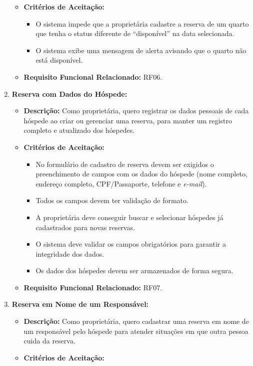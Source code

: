 \documentclass[
	12pt,				%
	openany,			%
	twoside,			%
	a4paper,			%
	english,			%
	french,				%
	spanish,			%
	brazil				%
	]{abntex2}
\begin{document}
\begin{enumerate}[label=\textbf{\arabic*.}]
\begin{itemize}
	 	\item \textbf{Critérios de Aceitação:}
	 	\begin{itemize}
	 		\item O sistema impede que a proprietária cadastre a reserva de um quarto que tenha o status diferente de “disponível” na data selecionada.
	 		\item O sistema exibe uma mensagem de alerta avisando que o quarto não está disponível.
	 	\end{itemize}
	 	\item \textbf{Requisito Funcional Relacionado:} RF06.
	 \end{itemize} 
	   \vspace{2cm}
	  \item \textbf{Reserva com Dados do Hóspede:}
	 \begin{itemize}
	 	\item \textbf{Descrição:} Como proprietária, quero registrar os dados pessoais de cada hóspede ao criar ou gerenciar uma reserva, para manter um registro completo e atualizado dos hóspedes.
	 	\item \textbf{Critérios de Aceitação:}
	 	\begin{itemize}
	 		\item No formulário de cadastro de reserva devem ser exigidos o preenchimento de campos com os dados do hóspede (nome completo, endereço completo, CPF/Passaporte, telefone e \textit{e-mail}).
	 		\item Todos os campos devem ter validação de formato.
	 		\item A proprietária deve conseguir buscar e selecionar hóspedes já cadastrados para novas reservas.
	 		\item O sistema deve validar os campos obrigatórios para garantir a integridade dos dados.
	 		\item Os dados dos hóspedes devem ser armazenados de forma segura.
	 	\end{itemize}
	 	\item \textbf{Requisito Funcional Relacionado:} RF07.
	 \end{itemize} 
	  \item \textbf{Reserva em Nome de um Responsável:}
	 \begin{itemize}
	 	\item \textbf{Descrição:} Como proprietária, quero cadastrar uma reserva em nome de um responsável pelo hóspede para atender situações em que outra pessoa cuida da reserva.
	 	\item \textbf{Critérios de Aceitação:}

\end{itemize}
\end{enumerate}
\end{document}

